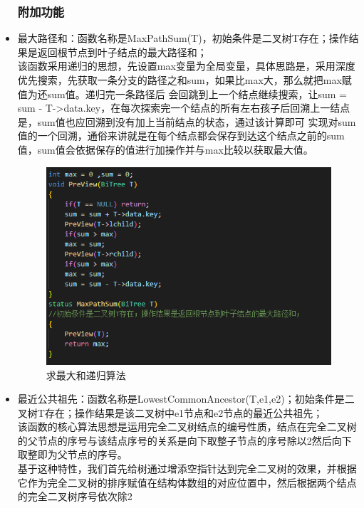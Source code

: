 \documentclass[supercite]{Experimental_Report}
\theoremstyle{definition}
\begin{document}
\begin{itemize}
	      \subsubsection{附加功能}
	\item 最大路径和：函数名称是MaxPathSum(T)，初始条件是二叉树T存在；操作结果是返回根节点到叶子结点的最大路径和；\\
	      该函数采用递归的思想，先设置max变量为全局变量，具体思路是，采用深度优先搜索，先获取一条分支的路径之和sum，如果比max大，那么就把max赋值为还sum值。递归完一条路径后
	      会回跳到上一个结点继续搜索，让sum = sum - T->data.key，在每次探索完一个结点的所有左右孩子后回溯上一结点是，sum值也应回溯到没有加上当前结点的状态，通过该计算即可
	      实现对sum值的一个回溯，通俗来讲就是在每个结点都会保存到达这个结点之前的sum值，sum值会依据保存的值进行加操作并与max比较以获取最大值。
	      \begin{figure}[htb]
		      \begin{center}
			      \includegraphics[scale=0.50]{images/pic-6.png}
			      \caption{求最大和递归算法}
			      \label{fig2-3}
		      \end{center}
	      \end{figure}
	\item 最近公共祖先：函数名称是LowestCommonAncestor(T,e1,e2)；初始条件是二叉树T存在；操作结果是该二叉树中e1节点和e2节点的最近公共祖先；\\
	      该函数的核心算法思想是运用完全二叉树结点的编号性质，结点在完全二叉树的父节点的序号与该结点序号的关系是向下取整子节点的序号除以2然后向下取整即为父节点的序号。\\
	      基于这种特性，我们首先给树通过增添空指针达到完全二叉树的效果，并根据它作为完全二叉树的排序赋值在结构体数组的对应位置中，然后根据两个结点的完全二叉树序号依次除2

\end{itemize}
\end{document}
